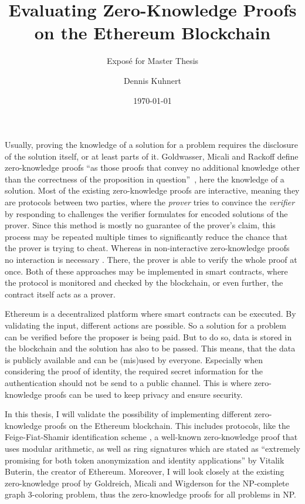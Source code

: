 \documentclass[a4paper,parskip=half]{scrartcl}
\title{Evaluating Zero-Knowledge Proofs on the Ethereum Blockchain\todo{determine title of thesis}}
\subtitle{Exposé for Master Thesis}
\author{Dennis Kuhnert}
\date{\today}
\begin{document}
\maketitle

Usually, proving the knowledge of a solution for a problem requires the disclosure of the solution itself, or at least parts of it.
Goldwasser, Micali and Rackoff define zero-knowledge proofs ``as those proofs that convey no additional knowledge other than the correctness of the proposition in question''~\cite{goldwasser1989knowledge}, here the knowledge of a solution.
Most of the existing zero-knowledge proofs are interactive, meaning they are protocols between two parties, where the \emph{prover} tries to convince the \emph{verifier} by responding to challenges the verifier formulates for encoded solutions of the prover.
Since this method is mostly no guarantee of the prover's claim, this process may be repeated multiple times to significantly reduce the chance that the prover is trying to cheat.
Whereas in non-interactive zero-knowledge proofs no interaction is necessary \cite{blum1988non}.
There, the prover is able to verify the whole proof at once.
Both of these approaches may be implemented in smart contracts, where the protocol is monitored and checked by the blockchain, or even further, the contract itself acts as a prover.

Ethereum is a decentralized platform where smart contracts can be executed.
By validating the input, different actions are possible.
So a solution for a problem can be verified before the proposer is being paid.
But to do so, data is stored in the blockchain and the solution has also to be passed.
This means, that the data is publicly available and can be (mis)used by everyone.
Especially when considering the proof of identity, the required secret information for the authentication should not be send to a public channel.
This is where zero-knowledge proofs can be used to keep privacy and ensure security.

In this thesis, I will validate the possibility of implementing different zero-knowledge proofs on the Ethereum blockchain.
This includes protocols, like the Feige-Fiat-Shamir identification scheme \cite{feige1988zero}, a well-known zero-knowledge proof that uses modular arithmetic, as well as 
ring signatures which are stated as ``extremely promising for both token anonymization and identity applications'' \cite{buterin2015public} by Vitalik Buterin, the creator of Ethereum.
Moreover, I will look closely at the existing zero-knowledge proof by Goldreich, Micali and Wigderson \cite{goldreich1991proofs} for the NP-complete graph 3-coloring problem, thus the zero-knowledge proofs for all problems in NP.
\end{document}
